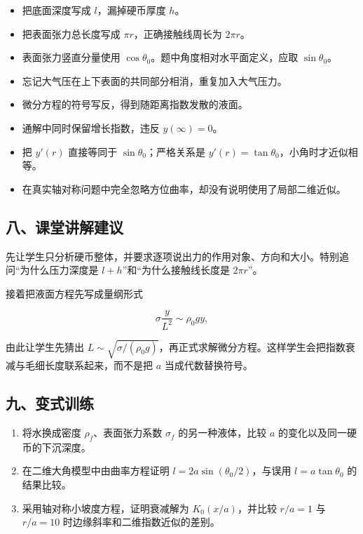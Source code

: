 \documentclass[12pt,a4paper,UTF8]{ctexart}
\newcommand{\tightlist}{\setlength{\itemsep}{0pt}\setlength{\parskip}{0pt}}
\begin{document}
\begin{itemize}
\tightlist
\item
  把底面深度写成 \(l\)，漏掉硬币厚度 \(h\)。
\item
  把表面张力总长度写成 \(\pi r\)，正确接触线周长为 \(2\pi r\)。
\item
  表面张力竖直分量使用 \(\cos\theta_0\)。题中角度相对水平面定义，应取
  \(\sin\theta_0\)。
\item
  忘记大气压在上下表面的共同部分相消，重复加入大气压力。
\item
  微分方程的符号写反，得到随距离指数发散的液面。
\item
  通解中同时保留增长指数，违反 \(y(\infty)=0\)。
\item
  把 \(y'(r)\) 直接等同于 \(\sin\theta_0\)；严格关系是
  \(y'(r)=\tan\theta_0\)，小角时才近似相等。
\item
  在真实轴对称问题中完全忽略方位曲率，却没有说明使用了局部二维近似。
\end{itemize}

\subsection{八、课堂讲解建议}\label{ux516bux8bfeux5802ux8bb2ux89e3ux5efaux8bae-1}

先让学生只分析硬币整体，并要求逐项说出力的作用对象、方向和大小。特别追问``为什么压力深度是
\(l+h\)''和``为什么接触线长度是 \(2\pi r\)''。

接着把液面方程先写成量纲形式

\[\sigma\frac{y}{L^2}\sim\rho_0gy,\]

由此让学生先猜出
\(L\sim\sqrt{\sigma/(\rho_0g)}\)，再正式求解微分方程。这样学生会把指数衰减与毛细长度联系起来，而不是把
\(a\) 当成代数替换符号。

\subsection{九、变式训练}\label{ux4e5dux53d8ux5f0fux8badux7ec3-1}

\begin{enumerate}
\def\labelenumi{\arabic{enumi}.}
\tightlist
\item
  将水换成密度 \(\rho_f\)、表面张力系数 \(\sigma_f\) 的另一种液体，比较
  \(a\) 的变化以及同一硬币的下沉深度。
\item
  在二维大角模型中由曲率方程证明 \(l=2a\sin(\theta_0/2)\)，与误用
  \(l=a\tan\theta_0\) 的结果比较。
\item
  采用轴对称小坡度方程，证明衰减解为 \(K_0(x/a)\)，并比较 \(r/a=1\) 与
  \(r/a=10\) 时边缘斜率和二维指数近似的差别。
\end{enumerate}
\end{document}
